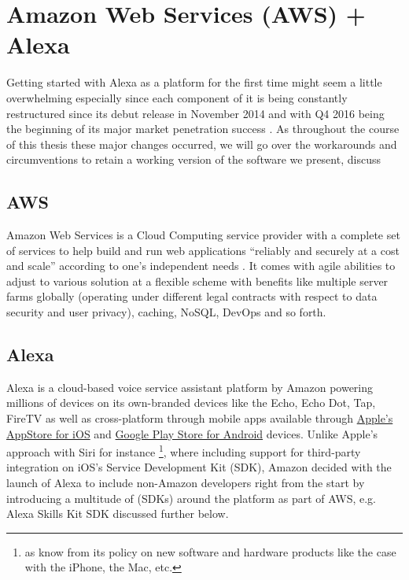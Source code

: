 \section{Amazon Web Services (AWS) + Alexa}


Getting started with Alexa as a platform for the first time might seem a little overwhelming especially since each component of it is being  constantly restructured since its debut release in November 2014 and with Q4 2016 being the beginning of its major market penetration success \cite{gartnerpreds17}. %
As throughout the course of this thesis these major changes occurred, %
 we will go over the workarounds and circumventions to retain a working version of the software we present, discuss

\subsection*{AWS}
Amazon Web Services is a Cloud Computing service provider with a complete set of services to help build and run web applications ``reliably and securely at a cost and scale'' according to one's independent needs \cite{aws_website}.
It comes with agile abilities to adjust to various solution at a flexible scheme with benefits like multiple server farms globally (operating under different legal contracts with respect to data security and user privacy), caching, NoSQL, DevOps and so forth.


\subsection*{Alexa}
Alexa is a cloud-based voice service assistant platform by Amazon powering millions of devices  on its own-branded devices like the Echo, Echo Dot, Tap, FireTV as well as cross-platform through mobile apps available through  \href{https://itunes.apple.com/de/app/amazon-alexa/id944011620?l=en&mt=8}{Apple's AppStore for iOS} and  \href{https://play.google.com/store/apps/details?id=com.amazon.dee.app&hl=en}{Google Play Store for Android} devices. Unlike Apple's approach with Siri for instance \footnote{as know from its policy on  new software and hardware products like the case with the iPhone, the Mac, etc.}, where including support for third-party integration on iOS's Service Development Kit (SDK), Amazon decided with the launch of Alexa to include non-Amazon developers right from the start by introducing a multitude of (SDKs) around the platform as part of AWS, e.g. Alexa Skills Kit SDK discussed further below.

